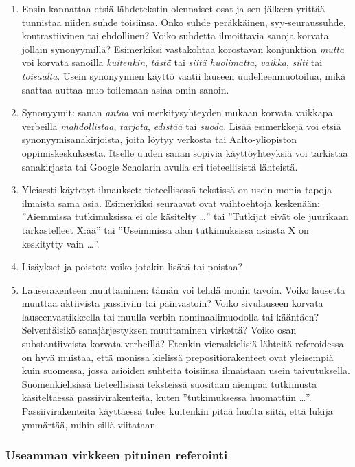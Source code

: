 \documentclass[finnish, 12pt, a4paper, elec, utf8, a-2b, online]{aaltothesis}
\begin{document}
\begin{enumerate}
	\item Ensin kannattaa etsiä lähdetekstin olennaiset osat ja sen jälkeen 
	yrittää tunnistaa niiden suhde toisiinsa. Onko suhde peräkkäinen, 
	syy-seuraussuhde, kontrastiivinen tai ehdollinen? Voiko suhdetta ilmoittavia 
	sanoja korvata jollain synonyymillä? Esimerkiksi vastakohtaa korostavan 
	konjunktion \emph{mutta} voi korvata sanoilla \emph{kuitenkin}, \emph{tästä}
	tai \emph{siitä huolimatta}, \emph{vaikka}, \emph{silti} tai 
	\emph{toisaalta}. Usein synonyymien käyttö vaatii lauseen 
	uudelleenmuotoilua, mikä saattaa auttaa muo-toilemaan asiaa omin sanoin.
	\item Synonyymit: sanan \emph{antaa} voi merkitysyhteyden mukaan korvata 
	vaikkapa verbeillä \emph{mahdollistaa}, \emph{tarjota}, \emph{edistää} tai 
	\emph{suoda}. Lisää esimerkkejä voi etsiä synonyymisanakirjoista, joita 
	löytyy verkosta tai Aalto-yliopiston oppimiskeskuksesta. Itselle uuden sanan
	sopivia käyttöyhteyksiä voi tarkistaa sanakirjasta tai Google Scholarin 
	avulla eri tieteellisistä lähteistä.
	\item Yleisesti käytetyt ilmaukset: tieteellisessä tekstissä on usein monia 
	tapoja ilmaista sama asia. Esimerkiksi seuraavat ovat vaihtoehtoja 
	keskenään: ”Aiemmissa tutkimuksissa ei ole käsitelty \ldots” tai ”Tutkijat 
	eivät ole juurikaan tarkastelleet X:ää” tai ”Useimmissa alan tutkimuksissa 
	asiasta X on keskitytty vain \ldots”.
	\item Lisäykset ja poistot: voiko jotakin lisätä tai poistaa?
	\item Lauserakenteen muuttaminen: tämän voi tehdä monin tavoin. Voiko 
	lausetta muuttaa aktiivista passiiviin tai päinvastoin? Voiko sivulauseen 
	korvata lauseenvastikkeella tai muulla verbin nominaalimuodolla tai 
	kääntäen? Selventäisikö sanajärjestyksen muuttaminen virkettä? Voiko osan 
	substantiiveista korvata verbeillä? Etenkin vieraskielisiä lähteitä 
	referoidessa on hyvä muistaa, että monissa kielissä prepositiorakenteet ovat 
	yleisempiä kuin suomessa, jossa asioiden suhteita toisiinsa ilmaistaan usein 
	taivutuksella. Suomenkielisissä tieteellisissä teksteissä suositaan aiempaa 
	tutkimusta käsiteltäessä  passiivirakenteita, kuten ”tutkimuksessa 
	huomattiin \ldots”. Passiivirakenteita käyttäessä tulee kuitenkin pitää 
	huolta siitä, että lukija ymmärtää, mihin sillä viitataan.
\end{enumerate}


\subsubsection*{Useamman virkkeen pituinen referointi}
\end{document}
